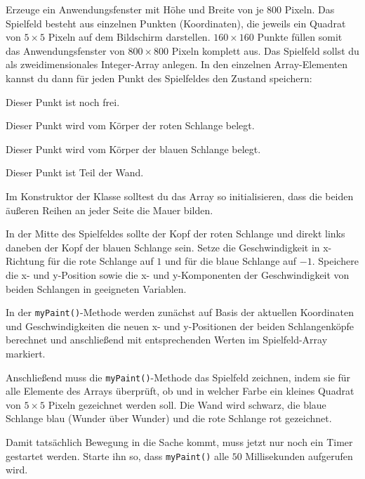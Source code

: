 \begin{compactenum}[a)]
\item Erzeuge ein Anwendungsfenster mit Höhe und Breite von je $800$ Pixeln. Das
Spielfeld besteht aus einzelnen Punkten (Koordinaten), die jeweils ein Quadrat
von $5 \times 5$ Pixeln auf dem Bildschirm darstellen. $160 \times 160$ Punkte
füllen somit das Anwendungsfenster von $800 \times 800$ Pixeln komplett aus.
Das Spielfeld sollst du als zweidimensionales Integer-Array anlegen. In den
einzelnen Array-Elementen kannst du dann für jeden Punkt des Spielfeldes den
Zustand speichern:

\begin{compactitem}
\item[$0$:] Dieser Punkt ist noch frei.
\item[$1$:] Dieser Punkt wird vom Körper der roten Schlange belegt.
\item[$2$:] Dieser Punkt wird vom Körper der blauen Schlange belegt.
\item[$-1$:] Dieser Punkt ist Teil der Wand.
\end{compactitem}

Im Konstruktor der Klasse solltest du das Array so initialisieren, dass die
beiden äußeren Reihen an jeder Seite die Mauer bilden.

In der Mitte des Spielfeldes sollte der Kopf der roten Schlange und direkt
links daneben der Kopf der blauen Schlange sein. Setze die Geschwindigkeit in
x-Richtung für die rote Schlange auf $1$ und für die blaue Schlange auf $-1$.
Speichere die x- und y-Position sowie die x- und y-Komponenten der
Geschwindigkeit von beiden Schlangen in geeigneten Variablen.

\item In der \lstinline|myPaint()|-Methode werden zunächst auf Basis der
aktuellen Koordinaten und Geschwindigkeiten die neuen x- und y-Positionen der
beiden Schlangenköpfe berechnet und anschließend mit entsprechenden Werten im
Spielfeld-Array markiert.

Anschließend muss die \lstinline|myPaint()|-Methode das Spielfeld zeichnen,
indem sie für alle Elemente des Arrays überprüft, ob und in welcher Farbe ein
kleines Quadrat von $5 \times 5$ Pixeln gezeichnet werden soll. Die Wand wird
schwarz, die blaue Schlange blau (Wunder über Wunder) und die rote Schlange rot
gezeichnet.

Damit tatsächlich Bewegung in die Sache kommt, muss jetzt nur noch ein Timer
gestartet werden. Starte ihn so, dass \lstinline|myPaint()| alle $50$
Millisekunden aufgerufen wird.


\end{compactenum}
